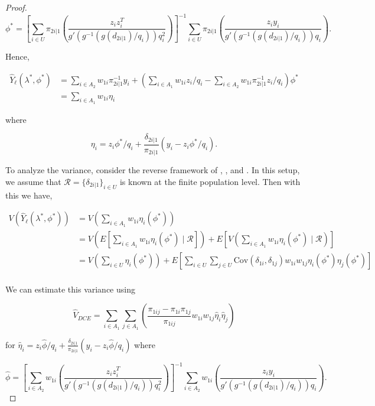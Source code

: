 \documentclass[12pt]{article}
\newcommand{\Cov}{{\text{Cov}}}
\begin{document}
\begin{proof}
  $$\phi^* = \left[\sum_{i \in U} \pi_{2i|1} \left(\frac{z_i z_i^T}{
    g'(g^{-1}(g(d_{2i|1}) / q_i))q_i^2}\right)\right]^{-1} \sum_{i \in U} \pi_{2i|1}
    \left(\frac{z_i y_i}{g'(g^{-1}(g(d_{2i|1}) / q_i)) q_i}\right).$$

  Hence,

  \begin{align*}
    \hat Y_\ell(\lambda^*, \phi^*) 
    &= \sum_{i \in A_2} w_{1i} \pi_{2i|1}^{-1}
    y_i + \left(\sum_{i \in A_1} w_{1i} z_i / q_i -
      \sum_{i \in A_2} w_{1i} \pi_{2i|1}^{-1} z_i / q_i\right)\phi^* \\ 
    &= \sum_{i \in A_1} w_{1i} \eta_i
  \end{align*}

  where 

  $$\eta_i = z_i \phi^* / q_i + \frac{\delta_{2i|1}}{\pi_{2i|1}} \left(y_i
  - z_i \phi^* / q_i\right).$$

  To analyze the variance, consider the reverse framework of
  \cite{fay1992inferences}, \cite{kim2006replication}, and \cite{shao1999variance}.
  In this setup, we assume that $\mathcal{R} = \{\delta_{2i|1}\}_{i \in U}$ is
  known at the
  finite population level. Then with this we have,

  \begin{align*}
    V(\hat Y_{\ell}(\lambda^*, \phi^*)) 
    &= V\left(\sum_{i \in A_1} w_{1i} \eta_i(\phi^*)\right) \\
    &= V\left(E\left[\sum_{i \in A_1} w_{1i}\eta_i(\phi^*)\mid\mathcal{R}\right]\right) 
    +E\left[V\left(\sum_{i \in A_1} w_{1i} \eta_i(\phi^*)\mid\mathcal{R}\right)\right]\\
    &= V\left(\sum_{i \in U} \eta_i(\phi^*)\right) + E\left[\sum_{i \in U} 
    \sum_{j \in U} \Cov(\delta_{1i}, \delta_{1j}) 
    w_{1i} w_{1j} \eta_i(\phi^*) \eta_j(\phi^*)\right]\\
  \end{align*}

  We can estimate this variance using 

  $$\hat V_{DCE} = \sum_{i \in A_1} \sum_{j \in A_1} \left(\frac{\pi_{1ij} -
  \pi_{1i}\pi_{1j}}{\pi_{1ij}}
    w_{1i} w_{1j} \hat \eta_i \hat \eta_j \right)
  $$

  for $\hat \eta_i = z_i \hat \phi / q_i + \frac{\delta_{2i|1}}{\pi_{2i|1}} \left(y_i
  - z_i \hat \phi / q_i\right)$ where 

  $$\hat \phi = \left[\sum_{i \in A_2} w_{1i}\left(\frac{z_i z_i^T}{
  g'(g^{-1}(g(d_{2i|1}) / q_i))q_i^2}\right)\right]^{-1} \sum_{i \in A_2} w_{1i}
    \left(\frac{z_i y_i}{g'(g^{-1}(g(d_{2i|1}) / q_i)) q_i}\right).$$


\end{proof}
\end{document}
